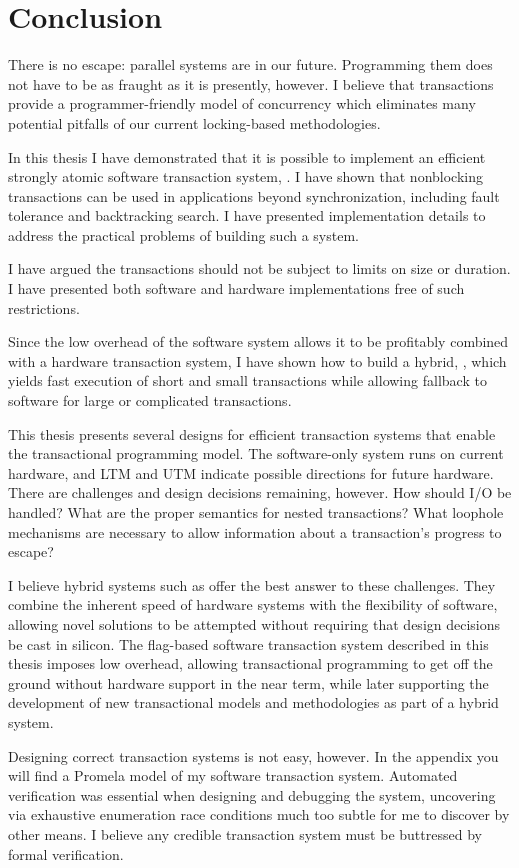 \chapter{Conclusion}\label{cha:concl}

There is no escape: parallel systems are in our future.
Programming them does not have to be as fraught as it is presently, however.
I believe that transactions provide a programmer-friendly model
of concurrency which eliminates many potential pitfalls of our
current locking-based methodologies.

In this thesis I have demonstrated that it is possible to implement an
efficient strongly atomic software transaction system, \apex.
I have shown that
nonblocking transactions can be used in applications beyond
synchronization, including fault tolerance and backtracking search.  I
have presented implementation details to address the practical
problems of building such a system. 

I have argued the transactions
should not be subject to limits on size or duration. I have presented
both software and hardware implementations free of such restrictions.

Since the low overhead of the \apex software system allows it to be
profitably combined with a hardware transaction system, I have shown
how to build a hybrid, \hyx, which yields fast execution of short and
small transactions 
while allowing fallback to software for large or complicated
transactions.

This thesis presents several designs for efficient
transaction systems that enable the
transactional programming model.  The \apex software-only system runs on
current hardware, and LTM and UTM indicate possible directions for future
hardware.  There are challenges and design decisions
remaining, however.  How should I/O be handled?  What are the proper semantics
for nested transactions?  What loophole mechanisms are necessary to
allow information about a transaction's progress to escape?

I believe hybrid systems such as \hyx offer the best answer to these
challenges.  They
combine the
inherent speed of hardware systems with the
flexibility of software, allowing novel solutions to be attempted
without requiring that design decisions be cast in silicon.  The
flag-based \apex software transaction system described in this thesis
imposes low overhead, allowing transactional
programming to get off the ground without hardware support in the near
term, while later supporting the development of new transactional models and
methodologies as part of a hybrid system.

Designing correct transaction systems is not easy, however.  In the
appendix you will find a Promela model of my software transaction
system.  Automated verification was essential when designing and
debugging the system, uncovering via exhaustive enumeration race
conditions much too subtle for me to discover by other means.  I
believe any credible transaction system must be buttressed by formal
verification.
